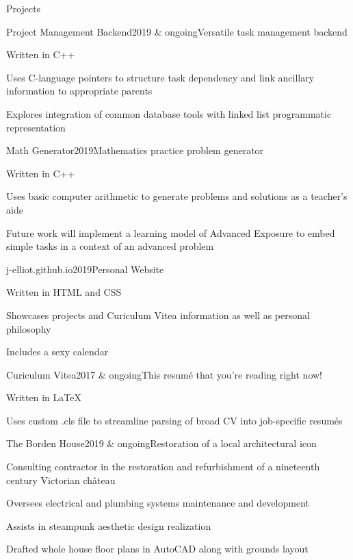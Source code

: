 \documentclass{resume} %
\begin{document}
\begin{rSection}{Projects}
\begin{rWorkSubsection}{Project Management Backend}{2019 \& ongoing}{Versatile task management backend}{}
\item Written in C++
\item Uses C-language pointers to structure task dependency and link ancillary information to appropriate parents
\item Explores integration of common database tools with linked list programmatic representation
\end{rWorkSubsection}


\begin{rWorkSubsection}{Math Generator}{2019}{Mathematics practice problem generator}{}
\item Written in C++
\item Uses basic computer arithmetic to generate problems and solutions as a teacher's aide
\item Future work will implement a learning model of Advanced Exposure to embed simple tasks in a context of an advanced problem
\end{rWorkSubsection}


\begin{rWorkSubsection}{j-elliot.github.io}{2019}{Personal Website}{}
\item Written in HTML and CSS
\item Showcases projects and Curiculum Vitea information as well as personal philosophy
\item Includes a sexy calendar
\end{rWorkSubsection}


\begin{rWorkSubsection}{Curiculum Vitea}{2017 \& ongoing}{This resum\'{e} that you're reading right now!}{}
\item Written in \LaTeX
\item Uses custom .cls file to streamline parsing of broad CV into job-specific resum\'{e}s
\end{rWorkSubsection}


\begin{rWorkSubsection}{The Borden House}{2019 \& ongoing}{Restoration of a local architectural icon}{}
\item Consulting contractor in the restoration and refurbishment of a nineteenth century Victorian ch\^{a}teau
\item Oversees electrical and plumbing systems maintenance and development
\item Assists in steampunk aesthetic design realization
\item Drafted whole house floor plans in AutoCAD along with grounds layout
\end{rWorkSubsection}


\end{rSection}
\end{document}
